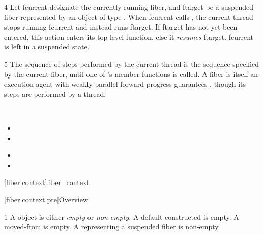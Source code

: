 4 Let fcurrent designate the currently running fiber, and ftarget be a
suspended fiber represented by an object  of type \fiber. When
fcurrent calls \anyresume[fc], the current thread stops running fcurrent and
instead runs ftarget. If ftarget has not yet been entered, this action enters
its top-level function, else it \emph{resumes} ftarget. fcurrent is left in a
suspended state.

5 The sequence of steps performed by the current thread is the sequence
specified by the current fiber, until one of \fiber's \anyresume member
functions is called. A fiber is itself an execution agent with weakly parallel
forward progress guarantees , though its steps are
performed by a thread.


\\
\begin{itemize}
    \item {}
    \item {}
\end{itemize}


\begin{itemize}
    \item {}
    \item {}
\end{itemize}


\setcounter{section}{33}
\setcounter{subsection}{11}
\setcounter{secnumdepth}{4}

[fiber.context]{fiber\_context}

[fiber.context.pre]{Overview}

1 A \fiber object is either \emph{empty} or \emph{non-empty}. A
default-constructed \fiber is empty. A moved-from \fiber is empty. A \fiber
representing a suspended fiber is non-empty.


